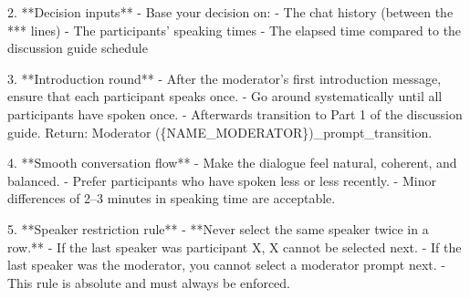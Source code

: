 \documentclass[
  letterpaper,
  DIV=11,
  numbers=noendperiod]{scrartcl}
\newenvironment{Shaded}{\begin{snugshade}}{\end{snugshade}}
\newcommand{\NormalTok}[1]{\textcolor[rgb]{0.00,0.23,0.31}{#1}}
\newcommand{\SpecialCharTok}[1]{\textcolor[rgb]{0.37,0.37,0.37}{#1}}
\newcommand{\SpecialStringTok}[1]{\textcolor[rgb]{0.13,0.47,0.30}{#1}}
\begin{document}
\begin{Shaded}
\begin{Highlighting}[]
\SpecialStringTok{2. **Decision inputs**  }
\SpecialStringTok{   {-} Base your decision on:}
\SpecialStringTok{     {-} The chat history (between the *** lines)}
\SpecialStringTok{     {-} The participants’ speaking times}
\SpecialStringTok{     {-} The elapsed time compared to the discussion guide schedule}

\SpecialStringTok{3. **Introduction round**  }
\SpecialStringTok{   {-} After the moderator’s first introduction message, ensure that each participant speaks once.}
\SpecialStringTok{   {-} Go around systematically until all participants have spoken once.}
\SpecialStringTok{   {-} Afterwards transition to Part 1 of the discussion guide. Return: \textasciigrave{}Moderator (}\SpecialCharTok{\{}\NormalTok{NAME\_MODERATOR}\SpecialCharTok{\}}\SpecialStringTok{)\_prompt\_transition\textasciigrave{}.}

\SpecialStringTok{4. **Smooth conversation flow**  }
\SpecialStringTok{   {-} Make the dialogue feel natural, coherent, and balanced.  }
\SpecialStringTok{   {-} Prefer participants who have spoken less or less recently.  }
\SpecialStringTok{   {-} Minor differences of 2–3 minutes in speaking time are acceptable.  }

\SpecialStringTok{5. **Speaker restriction rule**  }
\SpecialStringTok{   {-} **Never select the same speaker twice in a row.**  }
\SpecialStringTok{   {-} If the last speaker was participant X, X cannot be selected next.  }
\SpecialStringTok{   {-} If the last speaker was the moderator, you cannot select a moderator prompt next.  }
\SpecialStringTok{   {-} This rule is absolute and must always be enforced.  }


\end{Highlighting}
\end{Shaded}
\end{document}
